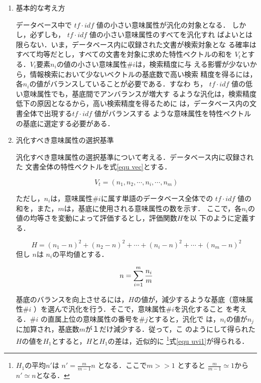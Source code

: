 \begin{enumerate}

\item {基本的な考え方}

データベース中で $tf \cdot idf$ 値の小さい意味属性が汎化の対象となる．
しかし，必ずしも， $tf \cdot idf$ 値の小さい意味属性のすべてを汎化すれ
ばよいとは限らない．いま，データベース内に収録された文書が検索対象とな
る確率はすべて均等だとし，すべての文書を対象に求めた特性ベクトルの和を
$V_t$とする．$V_t$要素$n_i$の値の小さい意味属性$\# i$は，検索精度に与
える影響が少ないから，情報検索において少ないベクトルの基底数で高い検索
精度を得るには，各$n_i$の値がバランスしていることが必要である．すなわ
ち， $tf \cdot idf$ 値の低い意味属性でも，基底間でアンバランスが増大す
るような汎化は，検索精度低下の原因となるから，高い検索精度を得るために
は，データベース内の文書全体で出現する$tf \cdot idf$ 値がバランスする
ような意味属性を特性ベクトルの基底に選定する必要がある．

\item {汎化すべき意味属性の選択基準}

汎化すべき意味属性の選択基準について考える．データベース内に収録された
文書全体の特性ベクトルを式\ref{equ vec}とする．

\begin{equation}
\label{equ vec}
V_t=(n_1,n_2, \cdots ,n_i, \cdots ,n_m) 
\end{equation}

ただし，$n_i$は，意味属性$ \# i $に属す単語のデータベース全体での $tf
\cdot idf$ 値の和を，また，$m$は，基底に使用される意味属性の数を示す．
ここで，各$n_i$の値の均等さを変動によって評価するとし，評価関数$H$を以
下のように定義する．

\begin{equation}
  H = (n_1-n)^2  +(n_2-n)^2 + \cdots +(n_i-n)^2  + \cdots + (n_m-n)^2   
\end{equation}
  但し $n$は $n_i$の平均値とする．

\begin{equation}
   n  = \sum _{i=1} ^ {m} {n_i \over m}
\end{equation}

基底のバランスを向上させるには，$H$の値が，減少するような基底（意味属
性$ \# i$ ）を選んで汎化を行う．そこで，意味属性$ \# i $を汎化すること
を考える．$ \# i$ の直属上位の意味属性の番号を$ \# j $とすると，汎化で
は，$n_i$の値が$n_j$に加算され，基底数$m$が１だけ減少する．従って，こ
のようにして得られた$H$の値を$H_1$とすると，$H$と$H_1$の差は，近似的に
\footnote {$H_1$の平均$n'$は $n'= \frac{m}{m-1} n$ となる．ここで$m >> 1 $
とすると $\frac {m}{m-1} \simeq 1$から$n' \simeq n$となる．}式\ref{equ uvi1}が得られる．


\end{enumerate}
